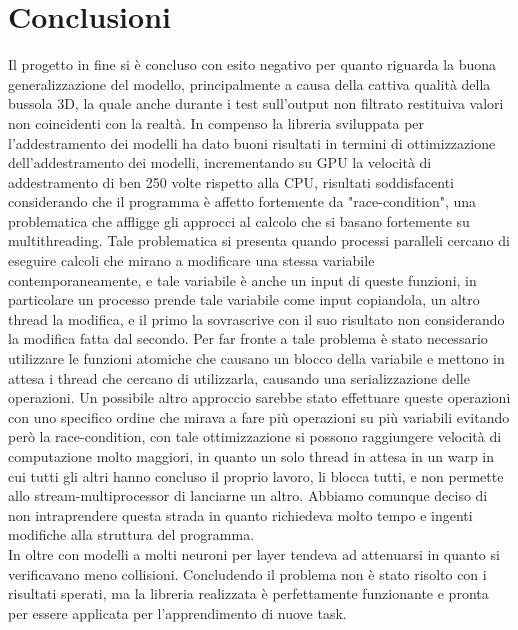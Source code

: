 \documentclass[10pt,a4paper]{article}
\begin{document}
\section{Conclusioni}
Il progetto in fine si è concluso con esito negativo per quanto riguarda la buona generalizzazione del modello, principalmente a causa della cattiva qualità della bussola 3D, la quale anche durante i test sull'output non filtrato restituiva valori non coincidenti con la realtà.
In compenso la libreria sviluppata per l'addestramento dei modelli ha dato buoni risultati in termini di ottimizzazione dell'addestramento dei modelli, incrementando su GPU la velocità di addestramento di ben 250 volte rispetto alla CPU, risultati soddisfacenti considerando che il programma è affetto fortemente da "race-condition", una problematica che affligge gli approcci al calcolo che si basano fortemente su multithreading.
Tale problematica si presenta quando processi paralleli cercano di eseguire calcoli che mirano a modificare una stessa variabile contemporaneamente, e tale variabile è anche un input di queste funzioni, in particolare un processo prende tale variabile come input copiandola, un altro thread la modifica, e il primo la sovrascrive con il suo risultato non considerando la modifica fatta dal secondo. Per far fronte a tale problema è stato necessario utilizzare le funzioni atomiche che causano un blocco della variabile e mettono in attesa i thread che cercano di utilizzarla, causando una serializzazione delle operazioni.
Un possibile altro approccio sarebbe stato effettuare queste operazioni con uno specifico ordine che mirava a fare più operazioni su più variabili evitando però la race-condition, con tale ottimizzazione si possono raggiungere velocità di computazione molto maggiori, in quanto un solo thread in attesa in un warp in cui tutti gli altri hanno concluso il proprio lavoro, li blocca tutti, e non permette allo stream-multiprocessor di lanciarne un altro.
Abbiamo comunque deciso di non intraprendere questa strada in quanto richiedeva molto tempo e ingenti modifiche alla struttura del programma.\\ 
In oltre con modelli a molti neuroni per layer tendeva ad attenuarsi in quanto si verificavano meno collisioni.
Concludendo il problema non è stato risolto con i risultati sperati, ma la libreria realizzata è perfettamente funzionante e pronta per essere applicata per l'apprendimento di nuove task.
\end{document}
